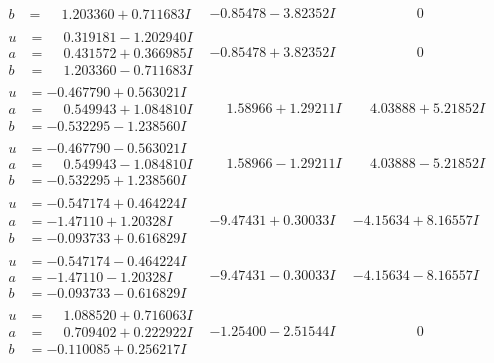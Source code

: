 \documentclass[1p]{elsarticle_modified}
\theoremstyle{definition}
\begin{document}
$$\begin{array}{c|c|c}
\begin{aligned}
b &= \phantom{-}1.203360 + 0.711683 I\end{aligned}
 & -0.85478 - 3.82352 I & \phantom{-0.000000 } 0 \\ \hline\begin{aligned}
u &= \phantom{-}0.319181 - 1.202940 I \\
a &= \phantom{-}0.431572 + 0.366985 I \\
b &= \phantom{-}1.203360 - 0.711683 I\end{aligned}
 & -0.85478 + 3.82352 I & \phantom{-0.000000 } 0 \\ \hline\begin{aligned}
u &= -0.467790 + 0.563021 I \\
a &= \phantom{-}0.549943 + 1.084810 I \\
b &= -0.532295 - 1.238560 I\end{aligned}
 & \phantom{-}1.58966 + 1.29211 I & \phantom{-}4.03888 + 5.21852 I \\ \hline\begin{aligned}
u &= -0.467790 - 0.563021 I \\
a &= \phantom{-}0.549943 - 1.084810 I \\
b &= -0.532295 + 1.238560 I\end{aligned}
 & \phantom{-}1.58966 - 1.29211 I & \phantom{-}4.03888 - 5.21852 I \\ \hline\begin{aligned}
u &= -0.547174 + 0.464224 I \\
a &= -1.47110 + 1.20328 I \\
b &= -0.093733 + 0.616829 I\end{aligned}
 & -9.47431 + 0.30033 I & -4.15634 + 8.16557 I \\ \hline\begin{aligned}
u &= -0.547174 - 0.464224 I \\
a &= -1.47110 - 1.20328 I \\
b &= -0.093733 - 0.616829 I\end{aligned}
 & -9.47431 - 0.30033 I & -4.15634 - 8.16557 I \\ \hline\begin{aligned}
u &= \phantom{-}1.088520 + 0.716063 I \\
a &= \phantom{-}0.709402 + 0.222922 I \\
b &= -0.110085 + 0.256217 I\end{aligned}
 & -1.25400 - 2.51544 I & \phantom{-0.000000 } 0 \\ \hline\begin{aligned}

\end{aligned}
\end{array}$$
\end{document}
